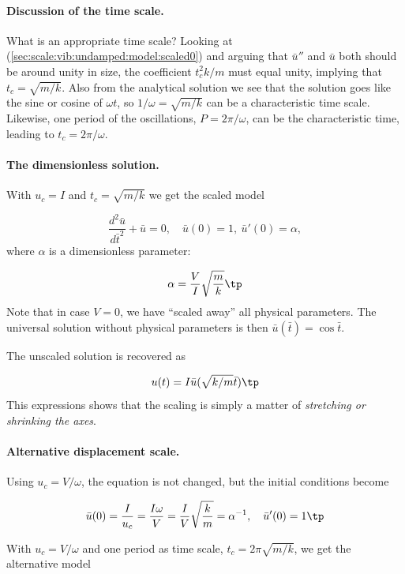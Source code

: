 \documentclass[graybox,envcountchap,sectrefs,final]{svmonodo}
\begin{document}
\paragraph{Discussion of the time scale.}
What is an appropriate time scale? Looking at
(\ref{sec:scale:vib:undamped:model:scaled0}) and arguing that
$\bar u''$ and $\bar u$ both should be around unity in size, the
coefficient $t_c^2k/m$ must equal unity, implying that $t_c=\sqrt{m/k}$.
Also from the analytical solution we see that the solution goes like the
sine or cosine of $\omega t$, so $1/\omega = \sqrt{m/k}$ can be a characteristic
time scale. Likewise, one period of the oscillations, $P=2\pi/\omega$, can
be the characteristic time, leading to $t_c=2\pi/\omega$.

\paragraph{The dimensionless solution.}
With $u_c=I$ and $t_c=\sqrt{m/k}$ we get the scaled model

\begin{equation}
\frac{d^2\bar u}{d\bar t^2} + \bar u = 0,
\quad \bar u(0)=1,\ \bar u'(0)=\alpha,
\label{sec:scale:vib:undamped:model:scaled1}
\end{equation}
where $\alpha$ is a dimensionless parameter:

\[ \alpha = \frac{V}{I}\sqrt{\frac{m}{k}}\tp\]
Note that in case $V=0$, we have ``scaled away'' all physical parameters.
The universal solution without physical parameters is then
$\bar u(\bar t)=\cos\bar t$.

The unscaled solution is recovered as

\begin{equation}
u(t) = I\bar u(\sqrt{k/m}\bar t)\tp
\end{equation}
This expressions shows that the scaling is simply a matter of
\emph{stretching or shrinking the axes}.

\paragraph{Alternative displacement scale.}
Using $u_c = V/\omega$, the equation
is not changed, but the initial conditions become

\[ \bar u(0) = \frac{I}{u_c} = \frac{I\omega}{V} =\frac{I}{V}\sqrt{\frac{k}{m}} = \alpha^{-1},\quad \bar u'(0)=1\tp\]


With $u_c=V/\omega$ and one period as time scale,
$t_c=2\pi\sqrt{m/k}$,
we get the alternative model
\end{document}
